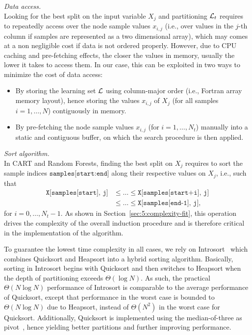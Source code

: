 \begin{description}

\item \textit{Data access.}\hfill\\
    Looking for the best split on the input variable $X_j$ and partitioning
    ${\cal L}_t$ requires to repeatedly access  over the node sample
    values $x_{i,j}$ (i.e., over values in the $j$-th column if samples are represented
    as a two dimensional array), which may comes at a non negligible cost if data is
    not ordered properly.  However, due to CPU caching and pre-fetching effects, the
    closer the values in memory, usually the lower it takes to access them. In
    our case, this can be exploited in two ways to minimize the cost of data access:

    \begin{itemize}
    \item By storing the learning set ${\cal L}$ using column-major order (i.e., Fortran
          array memory layout), hence storing the values $x_{i,j}$ of $X_j$ (for all samples $i=1,\dots,N$)
          contiguously in memory.
    \item By pre-fetching the node sample values $x_{i,j}$ (for $i = 1, \dots, N_t$) manually
          into a static and contiguous buffer, on which the search procedure
          is then applied.
    \end{itemize}

\item \textit{Sort algorithm.}\hfill\\
    In CART and Random Forests, finding the best split on $X_j$ requires
    to sort the sample indices $\texttt{samples[start:end]}$ along
    their respective values on $X_j$, i.e., such that
    \begin{align}
    \texttt{X[samples[start], j]} &\leq \dots \leq \texttt{X[samples[start+i], j]} \nonumber \\
                                  &\leq \dots \leq \texttt{X[samples[end-1], j]}, \nonumber
    \end{align}
    for $i=0,\dots,N_t-1$.
    As shown in Section~\ref{sec:5:complexity-fit},
    this operation drives the complexity of the overall induction procedure
    and  is therefore critical in the implementation of the algorithm.

    To guarantee the lowest time complexity in all cases, we rely on
    Introsort~\citep{musser:1997} which combines Quicksort and Heapsort into a
    hybrid sorting algorithm. Basically, sorting in Introsort begins with
    Quicksort and then switches to Heapsort when the depth of partitioning
    exceeds $\Theta(\log N)$. As such, the practical $\Theta(N\log N)$
    performance of Introsort is comparable to the average performance of
    Quicksort, except that performance in the worst case is bounded to
    $\Theta(N \log N)$  due to Heapsort, instead of $\Theta(N^2)$ in the
    worst case for Quicksort. Additionally, Quicksort is
    implemented using the median-of-three as pivot~\citep{bentley:1993}, hence
    yielding better partitions and further improving performance.


\end{description}
